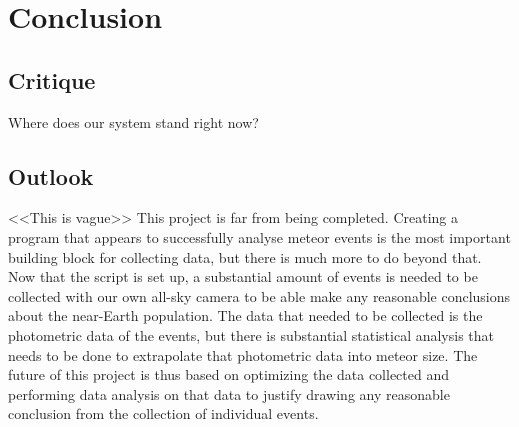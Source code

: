 \chapter{Conclusion}

\section{Critique}

Where does our system stand right now?

\section{Outlook}
<<This is vague>>
This project is far from being completed. Creating a program that appears to successfully analyse meteor events is the most important building block for collecting data, but there is much more to do beyond that. Now that the script is set up, a substantial amount of events is needed to be collected with our own all-sky camera to be able make any reasonable conclusions about the near-Earth population. The data that needed to be collected is the photometric data of the events, but there is substantial statistical analysis that needs to be done to extrapolate that photometric data into meteor size. The future of this project is thus based on optimizing the data collected and performing data analysis on that data to justify drawing any reasonable conclusion from the collection of individual events.
